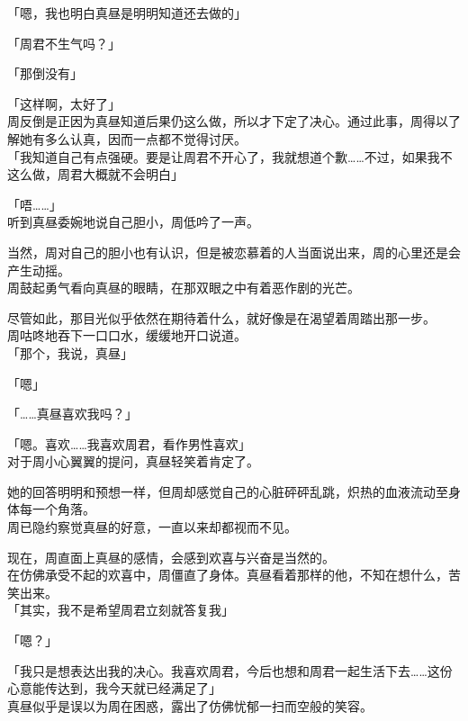 「嗯，我也明白真昼是明明知道还去做的」

「周君不生气吗？」

「那倒没有」

「这样啊，太好了」\\

周反倒是正因为真昼知道后果仍这么做，所以才下定了决心。通过此事，周得以了解她有多么认真，因而一点都不觉得讨厌。\\

「我知道自己有点强硬。要是让周君不开心了，我就想道个歉……不过，如果我不这么做，周君大概就不会明白」

「唔……」\\

听到真昼委婉地说自己胆小，周低吟了一声。

当然，周对自己的胆小也有认识，但是被恋慕着的人当面说出来，周的心里还是会产生动摇。\\

周鼓起勇气看向真昼的眼睛，在那双眼之中有着恶作剧的光芒。

尽管如此，那目光似乎依然在期待着什么，就好像是在渴望着周踏出那一步。\\

周咕咚地吞下一口口水，缓缓地开口说道。\\

「那个，我说，真昼」

「嗯」

「……真昼喜欢我吗？」

「嗯。喜欢……我喜欢周君，看作男性喜欢」\\

对于周小心翼翼的提问，真昼轻笑着肯定了。

她的回答明明和预想一样，但周却感觉自己的心脏砰砰乱跳，炽热的血液流动至身体每一个角落。\\

周已隐约察觉真昼的好意，一直以来却都视而不见。

现在，周直面上真昼的感情，会感到欢喜与兴奋是当然的。\\

在仿佛承受不起的欢喜中，周僵直了身体。真昼看着那样的他，不知在想什么，苦笑出来。\\

「其实，我不是希望周君立刻就答复我」

「嗯？」

「我只是想表达出我的决心。我喜欢周君，今后也想和周君一起生活下去……这份心意能传达到，我今天就已经满足了」\\

真昼似乎是误以为周在困惑，露出了仿佛忧郁一扫而空般的笑容。\\

